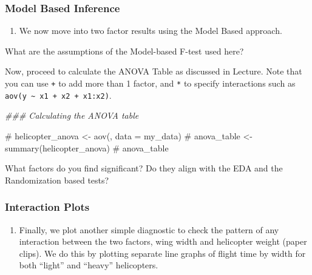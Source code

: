 \documentclass[
  letterpaper,
  DIV=11,
  numbers=noendperiod]{scrartcl}
\newenvironment{Shaded}{\begin{snugshade}}{\end{snugshade}}
\newcommand{\CommentTok}[1]{\textcolor[rgb]{0.37,0.37,0.37}{#1}}
\newcommand{\DocumentationTok}[1]{\textcolor[rgb]{0.37,0.37,0.37}{\textit{#1}}}
\providecommand{\tightlist}{%
  \setlength{\itemsep}{0pt}\setlength{\parskip}{0pt}}
\begin{document}
\subsubsection{Model Based Inference}\label{model-based-inference}

\begin{enumerate}
\def\labelenumi{\arabic{enumi}.}
\setcounter{enumi}{10}
\tightlist
\item
  We now move into two factor results using the Model Based approach.
\end{enumerate}

What are the assumptions of the Model-based F-test used here?

\hfill\break
\hfill\break
\hfill\break
\hfill\break

Now, proceed to calculate the ANOVA Table as discussed in Lecture. Note
that you can use \texttt{+} to add more than 1 factor, and \texttt{*} to
specify interactions such as
\texttt{aov(y\ \textasciitilde{}\ x1\ +\ x2\ +\ x1:x2)}.

\begin{Shaded}
\begin{Highlighting}[]
\DocumentationTok{\#\#\# Calculating the ANOVA table}

\CommentTok{\# helicopter\_anova \textless{}{-} aov(, data = my\_data)}
\CommentTok{\# anova\_table \textless{}{-} summary(helicopter\_anova)}
\CommentTok{\# anova\_table}
\end{Highlighting}
\end{Shaded}

What factors do you find significant? Do they align with the EDA and the
Randomization based tests?

\hfill\break
\hfill\break
\hfill\break
\hfill\break

\subsubsection{Interaction Plots}\label{interaction-plots}

\begin{enumerate}
\def\labelenumi{\arabic{enumi}.}
\setcounter{enumi}{11}
\tightlist
\item
  Finally, we plot another simple diagnostic to check the pattern of any
  interaction between the two factors, wing width and helicopter weight
  (paper clips). We do this by plotting separate line graphs of flight
  time by width for both ``light'' and ``heavy'' helicopters.
\end{enumerate}
\end{document}

